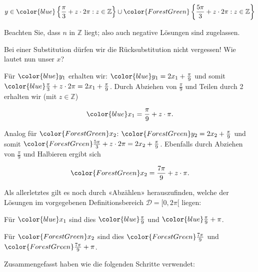 $$y \in {\color{blue}\left\{\frac{\pi}{3} + z\cdot{}2\pi: z\in\mathbb{Z}\right\}} \cup {\color{ForestGreen}\left\{\frac{5\pi}{3}+ z\cdot{}2\pi: z\in\mathbb{Z}\right\}}$$

Beachten Sie, dass $n$ in $\mathbb{Z}$ liegt; also auch negative Lösungen sind zugelassen.

Bei einer Substitution dürfen wir die Rücksubstitution nicht vergessen! Wie lautet nun unser $x$?

Für ${\color{blue}y_1}$ erhalten wir: ${\color{blue}y_1= 2x_1 + \frac{\pi}{9}}$ und somit ${\color{blue}\frac{\pi}{3} + z\cdot{}2\pi = 2x_1 + \frac{\pi}{9}}$. Durch Abziehen von $\frac{\pi}{9}$ und Teilen durch 2 erhalten wir (mit $z\in\mathbb{Z}$)

$${\color{blue}x_1 = \frac{\pi}{9} + z\cdot{}\pi}.$$

Analog für ${\color{ForestGreen}x_2}$: ${\color{ForestGreen}y_2 = 2x_2 + \frac{\pi}{9}}$ und somit ${\color{ForestGreen}\frac{5\pi}{3} + z\cdot{}2\pi = 2x_2 + \frac{\pi}{9}}$. Ebenfalls durch Abziehen von $\frac{\pi}{9}$ und Halbieren ergibt sich

$${\color{ForestGreen}x_2 = \frac{7\pi}{9} + z\cdot{}\pi.}$$

Als allerletztes gilt es noch durch «Abzählen» herauszufinden, welche der Lösungen im vorgegebenen Definitionsbereich $\mathcal{D} = [0, 2\pi[$ liegen:

    Für ${\color{blue}x_1}$ sind dies ${\color{blue}\frac{\pi}{9}}$ und ${\color{blue}\frac{\pi}{9} + \pi}$.

    Für ${\color{ForestGreen}x_2}$ sind dies ${\color{ForestGreen}\frac{7\pi}{9}}$ und ${\color{ForestGreen}\frac{7\pi}{9} + \pi}$.
   
    Zusammengefasst haben wie die folgenden Schritte verwendet:
\newpage


